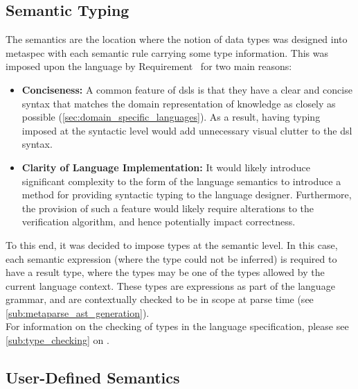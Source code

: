 
\subsection{Semantic Typing} %
\label{sub:semantic_typing}
The semantics are the location where the notion of data types was designed into \gls{metaspec} with each semantic rule carrying some type information. 
This was imposed upon the language by Requirement~ for two main reasons:
\begin{itemize}
    \item \textbf{Conciseness:} A common feature of \glspl{dsl} is that they have a clear and concise syntax that matches the domain representation of knowledge as closely as possible (\autoref{sec:domain_specific_languages}). 
    As a result, having typing imposed at the syntactic level would add unnecessary visual clutter to the \gls{dsl} syntax. 
    \item \textbf{Clarity of Language Implementation:} It would likely introduce significant complexity to the form of the language semantics to introduce a method for providing syntactic typing to the language designer.
    Furthermore, the provision of such a feature would likely require alterations to the verification algorithm, and hence potentially impact correctness. 
\end{itemize}

To this end, it was decided to impose types at the semantic level.
In this case, each semantic expression (where the type could not be inferred) is required to have a result type, where the types may be one of the types allowed by the current language context. 
These types are expressions as part of the language grammar, and are contextually checked to be in scope at parse time (see \autoref{sub:metaparse_ast_generation}).\\

For information on the checking of types in the language specification, please see \autoref{sub:type_checking} on . 


\subsection{User-Defined Semantics} %
\label{sub:user_defined_semantics}

